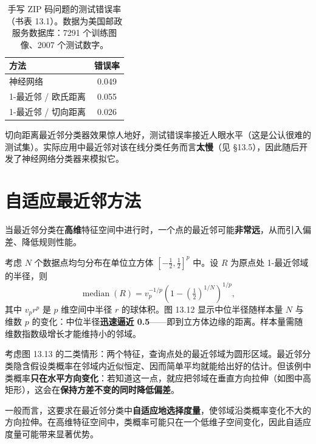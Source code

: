 \begin{table}[htbp]
\centering
\caption{手写 ZIP 码问题的测试错误率（书表 13.1）。数据为美国邮政服务数据库：7291 个训练图像、2007 个测试数字。}
\label{tab:13_1}
\begin{tabular}{lc}
\toprule
方法 & 错误率 \\
\midrule
神经网络 & 0.049 \\
1-最近邻 / 欧氏距离 & 0.055 \\
1-最近邻 / 切向距离 & 0.026 \\
\bottomrule
\end{tabular}
\end{table}

\begin{remark}[结果与实践]
切向距离最近邻分类器效果惊人地好，测试错误率接近人眼水平（这是公认很难的测试集）。实际应用中最近邻对该在线分类任务而言\textbf{太慢}（见 §13.5），因此随后开发了神经网络分类器来模拟它。
\end{remark}

\section{自适应最近邻方法}

当最近邻分类在\textbf{高维}特征空间中进行时，一个点的最近邻可能\textbf{非常远}，从而引入偏差、降低规则性能。

\begin{remark}[维数灾难的量化]
考虑 $N$ 个数据点均匀分布在单位立方体 $[-\tfrac{1}{2},\tfrac{1}{2}]^p$ 中。设 $R$ 为原点处 1-最近邻域的半径，则
\begin{equation}
\operatorname{median}(R) = v_p^{-1/p}\left(1 - \left(\tfrac{1}{2}\right)^{1/N}\right)^{1/p}, \label{eq:13_7}
\end{equation}
其中 $v_pr^p$ 是 $p$ 维空间中半径 $r$ 的球体积。图 13.12 显示中位半径随样本量 $N$ 与维数 $p$ 的变化：中位半径\textbf{迅速逼近 0.5}——即到立方体边缘的距离。样本量需随维数指数级增长才能维持小的邻域。
\end{remark}

\begin{remark}
考虑图 13.13 的二类情形：两个特征，查询点处的最近邻域为圆形区域。最近邻分类隐含假设类概率在邻域内近似恒定、因而简单平均就能给出好的估计。但该例中类概率\textbf{只在水平方向变化}：若知道这一点，就应把邻域在垂直方向拉伸（如图中高矩形），这会在\textbf{保持方差不变的同时降低偏差}。

一般而言，这要求在最近邻分类中\textbf{自适应地选择度量}，使邻域沿类概率变化不大的方向拉伸。在高维特征空间中，类概率可能只在一个低维子空间变化，因此自适应度量可能带来显著优势。
\end{remark}

